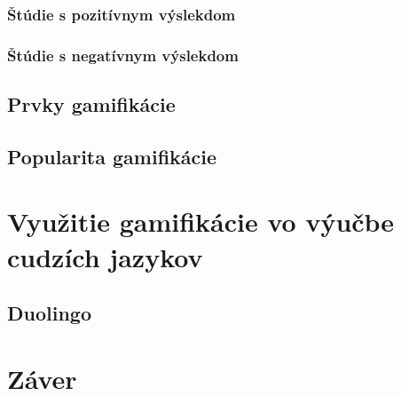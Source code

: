 \documentclass[10pt,oneside,slovak,a4paper]{article}
\begin{document}
\subsubsection{Štúdie s pozitívnym výslekdom} \label{pozit}
\subsubsection{Štúdie s negatívnym výslekdom} \label{negat}
\subsection{Prvky gamifikácie}
\subsection{Popularita gamifikácie}
\section{Využitie gamifikácie vo výučbe cudzích jazykov} \label{use}
\subsection{Duolingo} \label{duolingo}

\section{Záver} \label{zaver}


\end{document}
